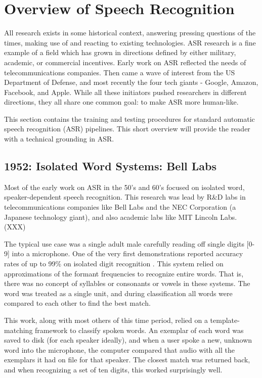 \documentclass[10pt,a4paper]{article}
\begin{document}
\newpage

\section{Overview of Speech Recognition}

All research exists in some historical context, answering pressing questions of the times, making use of and reacting to existing technologies. ASR research is a fine example of a field which has grown in directions defined by either military, academic, or commercial incentives. Early work on ASR reflected the needs of telecommunications companies. Then came a wave of interest from the US Department of Defense, and most recently the four tech giants - Google, Amazon, Facebook, and Apple. While all these initiators pushed researchers in different directions, they all share one common goal: to make ASR more human-like.

This section contains the training and testing procedures for standard automatic speech recognition (ASR) pipelines. This short overview will provide the reader with a technical grounding in ASR. 

\subsection{1952: Isolated Word Systems: Bell Labs}
Most of the early work on ASR in the 50's and 60's focused on isolated word, speaker-dependent speech recognition. This research was lead by R\&D labs in telecommunications companies like Bell Labs and the NEC Corporation (a Japanese technology giant), and also academic labs like MIT Lincoln Labs. (XXX)

The typical use case was a single adult male carefully reading off single digits [0-9] into a microphone. One of the very first demonstrations reported accuracy rates of up to 99\% on isolated digit recognition \cite{davis1952automatic}. This system relied on approximations of the formant frequencies to recognize entire words. That is, there was no concept of syllables or consonants or vowels in these systems. The word was treated as a single unit, and during classification all words were compared to each other to find the best match.

This work, along with most others of this time period, relied on a template-matching framework to classify spoken words. An exemplar of each word was saved to disk (for each speaker ideally), and when a user spoke a new, unknown word into the microphone, the computer compared that audio with all the exemplars it had on file for that speaker. The closest match was returned back, and when recognizing a set of ten digits, this worked surprisingly well. 
\end{document}

